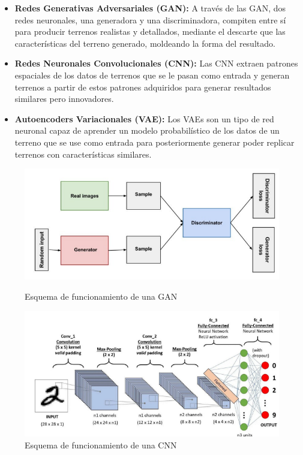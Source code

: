 \begin{itemize}
                \begin{itemize}
                    \item \textbf{Redes Generativas Adversariales (GAN):} A través de las GAN, dos redes neuronales, una generadora y una discriminadora, compiten entre sí para producir terrenos realistas y detallados, mediante el descarte que las características del terreno generado, moldeando la forma del resultado.                     
                    \item \textbf{Redes Neuronales Convolucionales (CNN):} Las CNN extraen patrones espaciales de los datos de terrenos que se le pasan como entrada y generan terrenos a partir de estos patrones adquiridos para generar resultados similares pero innovadores.
                    \item \textbf{Autoencoders Variacionales (VAE):} Los VAEs son un tipo de red neuronal capaz de aprender un modelo probabilístico de los datos de un terreno que se use como entrada para posteriormente generar poder replicar terrenos con características similares.
                \end{itemize}
                \begin{figure}[t]
                    \centering
                    \begin{minipage}[h]{0.75\textwidth}
                        \centering
                        \includegraphics[width=0.99\linewidth]{img/GAN-Overview.png}
                        \caption{Esquema de funcionamiento de una GAN}
                    \end{minipage}
                    \begin{minipage}[h]{0.75\textwidth}
                        \centering
                        \includegraphics[width=0.99\linewidth]{img/CNN-Overview.png}
                        \caption{Esquema de funcionamiento de una CNN}
                    \end{minipage}
                \end{figure}
                

\end{itemize}
